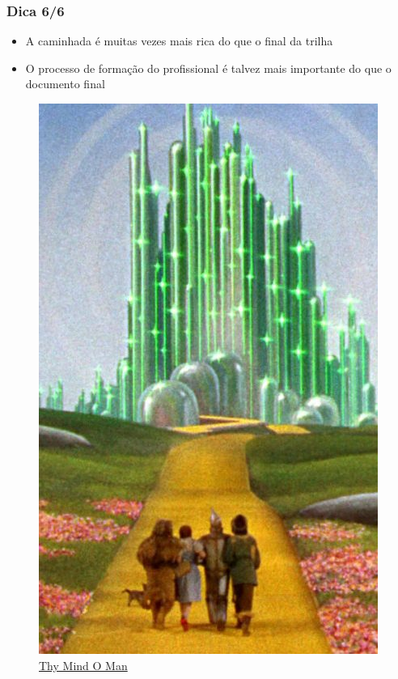 \begin{frame}
    \frametitle{Dica 6/6}
        \begin{itemize}
            \item A caminhada é muitas vezes mais rica do que o final da trilha
            \item O processo de formação do profissional é talvez mais importante do que o documento final
        \end{itemize}
        \begin{figure}
            \centering
            \includegraphics[width=0.3\linewidth]{figs/magicodeoz.jpg}
            \caption{\href{https://www.thymindoman.com/the-mysticism-of-the-wizard-of-oz-our-journey-home/}{Thy Mind O Man}}
        \end{figure}
\end{frame}
